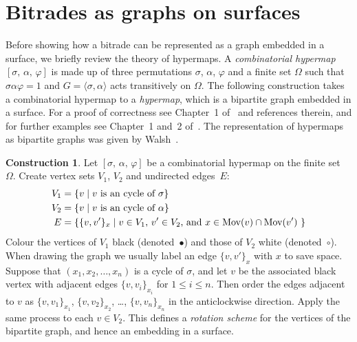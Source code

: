 \documentclass[amstags,fleqn,reqno]{article}
\theoremstyle{plain}
\theoremstyle{definition}
\newtheorem{construction}[theorem]{Construction}
\renewcommand\leq{\leqslant}
\newcommand{\darts}{\Omega\xspace}
\newcommand{\blackvertex}{\bullet}
\newcommand{\whitevertex}{\circ}
\newcommand{\mov}{\textnormal{Mov}}
\begin{document}
\section{Bitrades as graphs on surfaces}

% 

Before showing how a bitrade can be represented as a graph embedded in a
surface, we briefly review the theory of hypermaps.  A {\em combinatorial hypermap\/} 
$[\sigma,\, \alpha,\, \varphi]$
is made up of three permutations
$\sigma$, $\alpha$, $\varphi$ and
a finite set $\darts$ such that
$\sigma \alpha \varphi = 1$ and $G = \langle \sigma, \alpha
\rangle$ acts transitively on $\darts$. The following construction takes
a combinatorial hypermap to a {\em hypermap}, which is a 
bipartite graph embedded in a surface. For
a proof of correctness see Chapter~1 of~\cite{LZ} and references therein, 
and for further examples see Chapter~1 and~2 of~\cite{hamalainen2007}.
The representation of hypermaps as bipartite graphs was given by
Walsh~\cite{MR0360328}.

\begin{construction}\label{constrPairToBipartiteGraph}
Let $[\sigma,\, \alpha,\, \varphi]$ be a combinatorial hypermap on the
finite set~$\darts$.
Create vertex sets $V_1$, $V_2$ and undirected edges~$E$:
\begin{align*}
V_1 &= \{ v \mid \text{$v$ is an cycle of $\sigma$} \} \\
V_2 &= \{ v \mid \text{$v$ is an cycle of $\alpha$} \} \\
E &= \{ \{ v,v' \}_x \mid \text{$v \in V_1$, $v' \in V_2$, and 
$x \in \mov(v) \cap \mov(v')$ }\}
\end{align*}
Colour the vertices of $V_1$ black (denoted~$\blackvertex$) and those of
$V_2$ white (denoted~$\whitevertex$). When drawing the graph we usually 
label an edge $\{ v,v' \}_x$ with $x$ to save space.
Suppose that $(x_1, x_2, \dots, x_n)$ is a cycle of $\sigma$, and let $v$ be
the associated black vertex with adjacent edges
$\{ v, v_i \}_{x_i}$ for $1 \leq i \leq n$.
Then order the edges adjacent to $v$ as 
$\{ v, v_1 \}_{x_1}$,
$\{ v, v_2 \}_{x_2}$,
\dots,
$\{ v, v_n \}_{x_n}$ in the anticlockwise direction. Apply the same
process to each $v \in V_2$. This defines a {\em rotation scheme} for the
vertices of the bipartite graph, and hence an embedding in a surface.
\end{construction}
\end{document}
